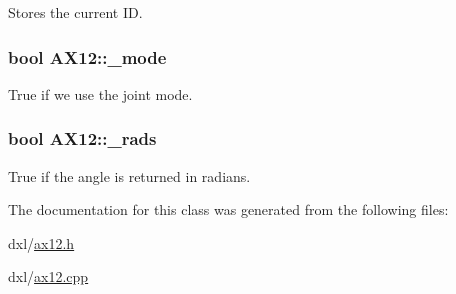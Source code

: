 Stores the current I\+D. 

\hypertarget{a00001_a2fd07e2e636003227a32d09d211bd6d4}{}
\subsubsection[{\+\_\+mode}]{\setlength{\rightskip}{0pt plus 5cm}bool A\+X12\+::\+\_\+mode\hspace{0.3cm}{\ttfamily [private]}}\label{a00001_a2fd07e2e636003227a32d09d211bd6d4}


True if we use the joint mode. 

\hypertarget{a00001_aba71492043d7a3226f0793db57372bec}{}
\subsubsection[{\+\_\+rads}]{\setlength{\rightskip}{0pt plus 5cm}bool A\+X12\+::\+\_\+rads\hspace{0.3cm}{\ttfamily [private]}}\label{a00001_aba71492043d7a3226f0793db57372bec}


True if the angle is returned in radians. 



The documentation for this class was generated from the following files\+:\begin{DoxyCompactItemize}
\item 
dxl/\hyperlink{a00009}{ax12.\+h}\item 
dxl/\hyperlink{a00008}{ax12.\+cpp}\end{DoxyCompactItemize}
